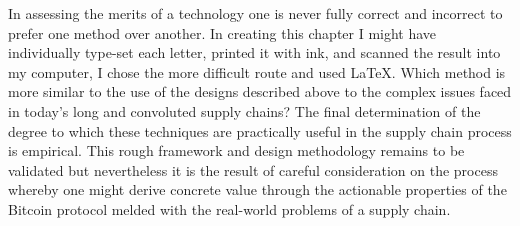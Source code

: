 In assessing the merits of a technology one is never fully correct and incorrect to prefer one method over another. 
In creating this chapter I might have individually type-set each letter, printed it with ink, and scanned the result into my computer, I chose the more difficult route and used \LaTeX.
Which method is more similar to the use of the designs described above to the complex issues faced in today's long and convoluted supply chains? 
The final determination of the degree to which these techniques are practically useful in the supply chain process is empirical. 
This rough framework and design methodology remains to be validated but nevertheless it is the result of careful consideration on the process whereby one might derive concrete value through the actionable properties of the Bitcoin protocol melded with the real-world problems of a supply chain. 


















